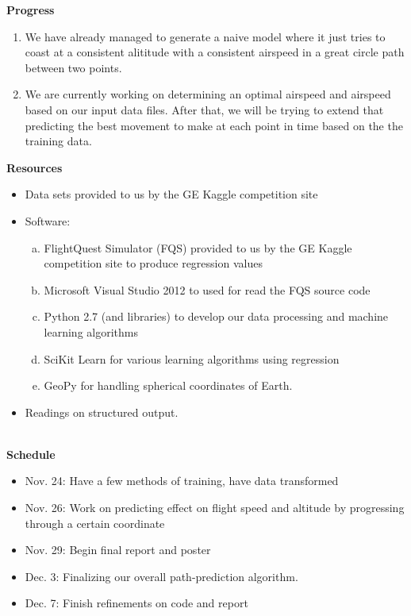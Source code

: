 \documentclass{article}[9pt]
\begin{document}
\noindent
\Large{\textbf{Progress}}
\begin{enumerate}
		\item We have already managed to generate a naive model where it just tries to coast at a consistent alititude with a consistent airspeed in a great circle path between two points.
		\item We are currently working on determining an optimal airspeed and airspeed based on our input data files. After that, we will be trying to extend that predicting the best movement to make at each point in time based on the the training data.
\end{enumerate}
\noindent
\Large{\textbf{Resources}}
\begin{itemize}
    \item Data sets provided to us by the GE Kaggle competition site
    \item Software: 
        \begin{enumerate}[(a)]
            \item FlightQuest Simulator (FQS) provided to us by the GE Kaggle competition site to produce regression values
            \item Microsoft Visual Studio 2012 to used for read the FQS source code
            \item Python 2.7 (and libraries) to develop our data processing and machine learning algorithms
            \item SciKit Learn for various learning algorithms using regression
            \item GeoPy for handling spherical coordinates of Earth.
        \end{enumerate}
    \item Readings on structured output. 
   \end{itemize}
\hspace*{\fill}\\
\Large{\textbf{Schedule}}
\noindent
\begin{itemize}
	\item Nov. 24: Have a few methods of training, have data transformed
	\item Nov. 26: Work on predicting effect on flight speed and altitude by progressing through a certain coordinate
	\item Nov. 29: Begin final report and poster
	\item Dec. 3: Finalizing our overall path-prediction algorithm.
	\item Dec. 7: Finish refinements on code and report 
\end{itemize}
\end{document}
